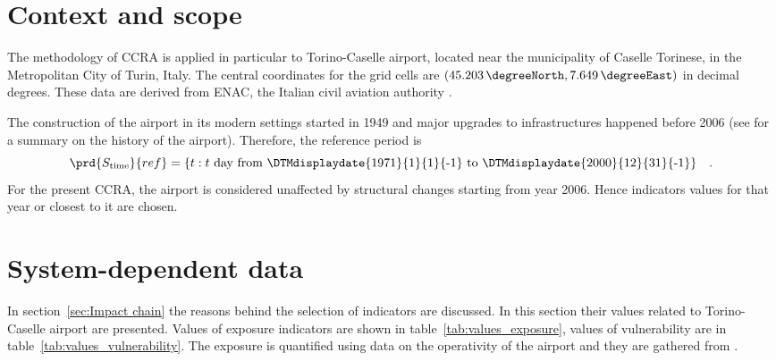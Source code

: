 \section{Context and scope}
The methodology of \gls{CCRA} is applied in particular to Torino-Caselle airport, located near the municipality of Caselle Torinese, in the Metropolitan City of Turin, Italy.
The central coordinates for the grid cells are $(\qty{45.203}{\degreeNorth}, \qty{7.649}{\degreeEast})$ in decimal degrees. These data are derived from \gls{ENAC}, the Italian civil aviation authority \cite{2014ENACTorinoCaselle}.

The construction of the airport in its modern settings started in 1949 and major upgrades to infrastructures happened before 2006 (see \cite[18]{2015PudduCorporateSocial} for a summary on the history of the airport). Therefore, the reference period is
\begin{equation}
  \label{eq:period_reference_torino}
  \prd{S_\text{time}}{ref} = \{ t : \text{$t$ day from \DTMdisplaydate{1971}{1}{1}{-1} to \DTMdisplaydate{2000}{12}{31}{-1}} \}
  \quad .
\end{equation}
For the present \gls{CCRA}, the airport is considered unaffected by structural changes starting from year 2006. Hence \glspl{indicator} values for that year or closest to it are chosen.



\section{System-dependent data}
In section~\ref{sec:Impact chain} the reasons behind the selection of \glspl{indicator} are discussed. In this section their values related to Torino-Caselle airport are presented. Values of \gls{exposure} indicators are shown in table~\ref{tab:values_exposure}, values of \gls{vulnerability} are in table~\ref{tab:values_vulnerability}.
The exposure is quantified using data on the operativity of the airport and they are gathered from \cite[154-179]{2010OneWorksAtlanteDegli}.

